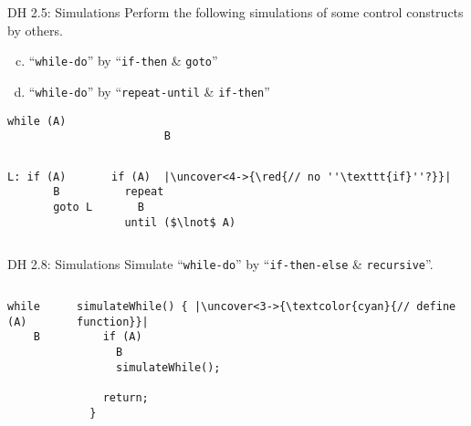 \begin{frame}[fragile]{}
  \begin{exampleblock}{DH 2.5: Simulations}
    Perform the following simulations of some control constructs by others.
    \begin{enumerate}[(a)]
      \setcounter{enumi}{(2)}
      \item ``\texttt{while-do}'' by ``\texttt{if-then} \& \texttt{goto}''
      \item ``\texttt{while-do}'' by ``\texttt{repeat-until} \& \texttt{if-then}''
    \end{enumerate}
  \end{exampleblock}

  \begin{lstlisting}[style = Cstyle, backgroundcolor = \color{teal!10!lightgray}]
                      while (A)
                        B
  \end{lstlisting}

  \begin{columns}
      \pause
      \begin{lstlisting}[style = Cstyle]
  L: if (A)
       B
       goto L
      \end{lstlisting}
      \pause
      \begin{lstlisting}[style = Cstyle]
  if (A)  |\uncover<4->{\red{// no ''\texttt{if}''?}}|
  repeat
    B
  until ($\lnot$ A)
      \end{lstlisting}
  \end{columns}
\end{frame}

\begin{frame}[fragile]{}
  \begin{exampleblock}{DH 2.8: Simulations}
    Simulate ``\texttt{while-do}'' by ``\texttt{if-then-else} \& \texttt{recursive}''.
  \end{exampleblock}

  \begin{columns}
      \begin{lstlisting}[style = Cstyle, backgroundcolor = \color{teal!10!lightgray}]
  while (A)
    B
      \end{lstlisting}
      \pause
      \begin{lstlisting}[style = Cstyle]
  simulateWhile() { |\uncover<3->{\textcolor{cyan}{// define function}}|
    if (A)
      B
      simulateWhile();

    return;
  }
      \end{lstlisting}
  \end{columns}

\end{frame}

